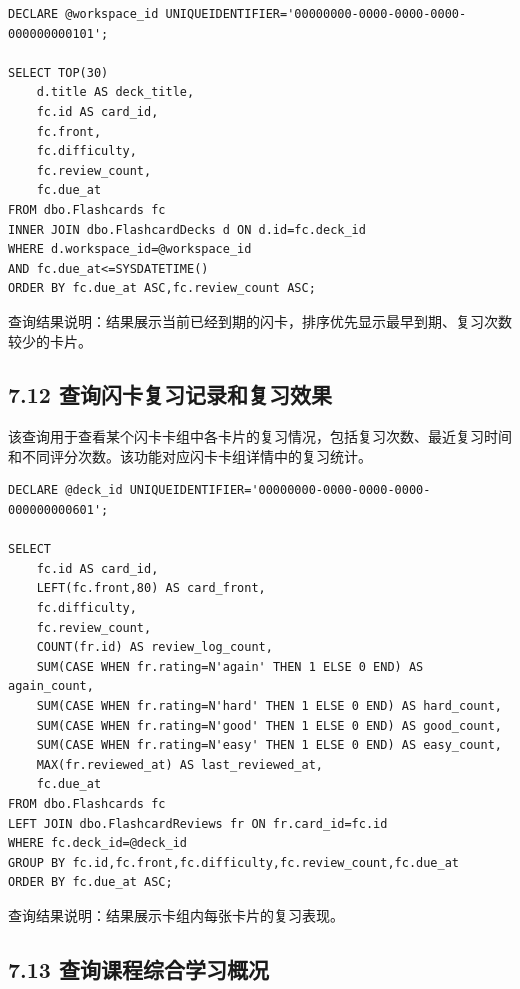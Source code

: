 \documentclass[10pt,a4paper,fontset=none]{ctexart}
\begin{document}
\begin{Verbatim}[fontsize=\scriptsize,frame=single]
DECLARE @workspace_id UNIQUEIDENTIFIER='00000000-0000-0000-0000-000000000101';

SELECT TOP(30)
    d.title AS deck_title,
    fc.id AS card_id,
    fc.front,
    fc.difficulty,
    fc.review_count,
    fc.due_at
FROM dbo.Flashcards fc
INNER JOIN dbo.FlashcardDecks d ON d.id=fc.deck_id
WHERE d.workspace_id=@workspace_id
AND fc.due_at<=SYSDATETIME()
ORDER BY fc.due_at ASC,fc.review_count ASC;
\end{Verbatim}

查询结果说明：结果展示当前已经到期的闪卡，排序优先显示最早到期、复习次数较少的卡片。\par

\subsection*{7.12 查询闪卡复习记录和复习效果}

该查询用于查看某个闪卡卡组中各卡片的复习情况，包括复习次数、最近复习时间和不同评分次数。该功能对应闪卡卡组详情中的复习统计。\par

\begin{Verbatim}[fontsize=\scriptsize,frame=single]
DECLARE @deck_id UNIQUEIDENTIFIER='00000000-0000-0000-0000-000000000601';

SELECT
    fc.id AS card_id,
    LEFT(fc.front,80) AS card_front,
    fc.difficulty,
    fc.review_count,
    COUNT(fr.id) AS review_log_count,
    SUM(CASE WHEN fr.rating=N'again' THEN 1 ELSE 0 END) AS again_count,
    SUM(CASE WHEN fr.rating=N'hard' THEN 1 ELSE 0 END) AS hard_count,
    SUM(CASE WHEN fr.rating=N'good' THEN 1 ELSE 0 END) AS good_count,
    SUM(CASE WHEN fr.rating=N'easy' THEN 1 ELSE 0 END) AS easy_count,
    MAX(fr.reviewed_at) AS last_reviewed_at,
    fc.due_at
FROM dbo.Flashcards fc
LEFT JOIN dbo.FlashcardReviews fr ON fr.card_id=fc.id
WHERE fc.deck_id=@deck_id
GROUP BY fc.id,fc.front,fc.difficulty,fc.review_count,fc.due_at
ORDER BY fc.due_at ASC;
\end{Verbatim}

查询结果说明：结果展示卡组内每张卡片的复习表现。\par

\subsection*{7.13 查询课程综合学习概况}
\end{document}
